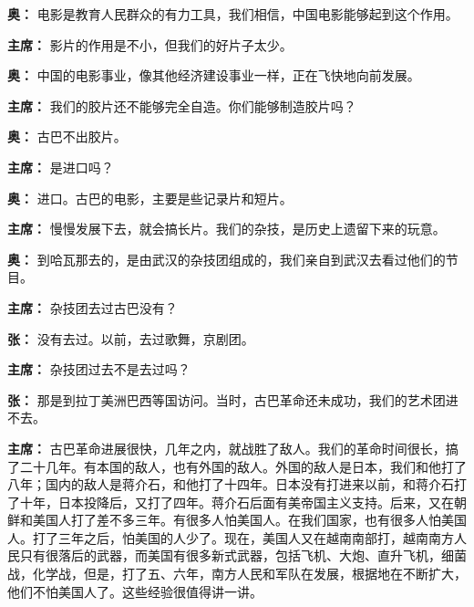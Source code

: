 \begin{duihua}
\item[\textbf{奥：}] 电影是教育人民群众的有力工具，我们相信，中国电影能够起到这个作用。

\item[\textbf{主席：}] 影片的作用是不小，但我们的好片子太少。

\item[\textbf{奥：}] 中国的电影事业，像其他经济建设事业一样，正在飞快地向前发展。

\item[\textbf{主席：}] 我们的胶片还不能够完全自造。你们能够制造胶片吗？

\item[\textbf{奥：}] 古巴不出胶片。

\item[\textbf{主席：}] 是进口吗？

\item[\textbf{奥：}] 进口。古巴的电影，主要是些记录片和短片。

\item[\textbf{主席：}] 慢慢发展下去，就会搞长片。我们的杂技，是历史上遗留下来的玩意。

\item[\textbf{奥：}] 到哈瓦那去的，是由武汉的杂技团组成的，我们亲自到武汉去看过他们的节目。

\item[\textbf{主席：}] 杂技团去过古巴没有？

\item[\textbf{张：}] 没有去过。以前，去过歌舞，京剧团。

\item[\textbf{主席：}] 杂技团过去不是去过吗？

\item[\textbf{张：}] 那是到拉丁美洲巴西等国访问。当时，古巴革命还未成功，我们的艺术团进不去。

\item[\textbf{主席：}] 古巴革命进展很快，几年之内，就战胜了敌人。我们的革命时间很长，搞了二十几年。有本国的敌人，也有外国的敌人。外国的敌人是日本，我们和他打了八年；国内的敌人是蒋介石，和他打了十四年。日本没有打进来以前，和蒋介石打了十年，日本投降后，又打了四年。蒋介石后面有美帝国主义支持。后来，又在朝鲜和美国人打了差不多三年。有很多人怕美国人。在我们国家，也有很多人怕美国人。打了三年之后，怕美国的人少了。现在，美国人又在越南南部打，越南南方人民只有很落后的武器，而美国有很多新式武器，包括飞机、大炮、直升飞机，细菌战，化学战，但是，打了五、六年，南方人民和军队在发展，根据地在不断扩大，他们不怕美国人了。这些经验很值得讲一讲。


\end{duihua}

